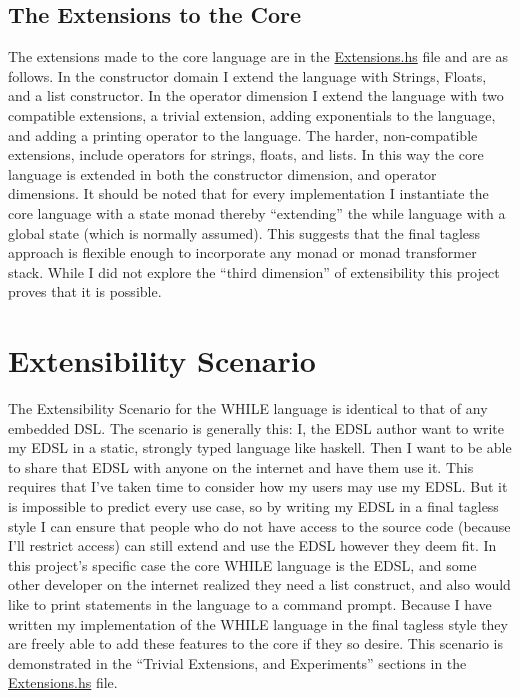 \documentclass[9pt,letterpaper]{extarticle}
\begin{document}
  \subsection{The Extensions to the Core}
  The extensions made to the core language are in the \underline{Extensions.hs}
  file and are as follows. In the constructor domain I extend the language with
  Strings, Floats, and a list constructor. In the operator dimension I extend
  the language with two compatible extensions, a trivial extension, adding
  exponentials to the language, and adding a printing operator to the language.
  The harder, non-compatible extensions, include operators for strings, floats,
  and lists. In this way the core language is extended in both the constructor
  dimension, and operator dimensions. It should be noted that for every
  implementation I instantiate the core language with a state monad thereby
  ``extending'' the while language with a global state (which is normally
  assumed). This suggests that the final tagless approach is flexible enough to
  incorporate any monad or monad transformer stack. While I did not explore the
  ``third dimension'' of extensibility this project proves that it is possible.

	\section{Extensibility Scenario}
  The Extensibility Scenario for the WHILE language is identical to that of any
  embedded DSL. The scenario is generally this: I, the EDSL author want to write
  my EDSL in a static, strongly typed language like haskell. Then I want to be
  able to share that EDSL with anyone on the internet and have them use it. This
  requires that I've taken time to consider how my users may use my EDSL. But it
  is impossible to predict every use case, so by writing my EDSL in a final
  tagless style I can ensure that people who do not have access to the source
  code (because I'll restrict access) can still extend and use the EDSL however
  they deem fit. In this project's specific case the core WHILE language is the
  EDSL, and some other developer on the internet realized they need a list
  construct, and also would like to print statements in the language to a
  command prompt. Because I have written my implementation of the WHILE language
  in the final tagless style they are freely able to add these features to the
  core if they so desire. This scenario is demonstrated in the ``Trivial
  Extensions, and Experiments'' sections in the \underline{Extensions.hs} file.
\end{document}
